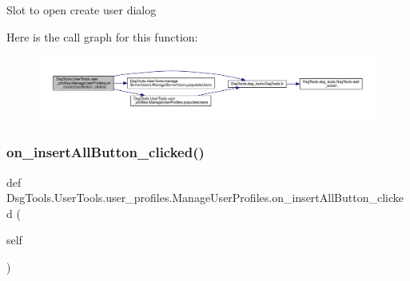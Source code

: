 \begin{DoxyVerb}Slot to open create user dialog
\end{DoxyVerb}
 Here is the call graph for this function\+:
\nopagebreak
\begin{figure}[H]
\begin{center}
\leavevmode
\includegraphics[width=350pt]{class_dsg_tools_1_1_user_tools_1_1user__profiles_1_1_manage_user_profiles_aa73f5b9db86127096b292eaf71e5b60a_cgraph}
\end{center}
\end{figure}
\mbox{\label{class_dsg_tools_1_1_user_tools_1_1user__profiles_1_1_manage_user_profiles_a8aa13a0696007e61005d54b7babd9f80}} 
\subsubsection{\texorpdfstring{on\+\_\+insert\+All\+Button\+\_\+clicked()}{on\_insertAllButton\_clicked()}}
{\footnotesize\ttfamily def Dsg\+Tools.\+User\+Tools.\+user\+\_\+profiles.\+Manage\+User\+Profiles.\+on\+\_\+insert\+All\+Button\+\_\+clicked (\begin{DoxyParamCaption}\item[{}]{self }\end{DoxyParamCaption})}

